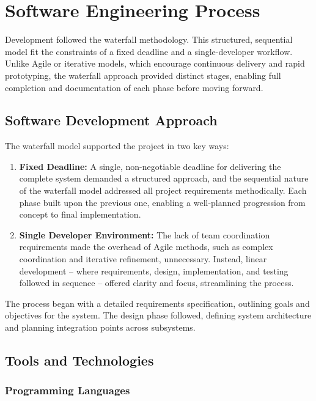 \chapter{Software Engineering Process}
\label{chapter:sep}


Development followed the waterfall methodology\cite{royce1987managing}. This structured, sequential model fit the constraints of a fixed deadline and a single-developer workflow. Unlike Agile\cite{atlassian2025agile} or iterative models, which encourage continuous delivery and rapid prototyping, the waterfall approach provided distinct stages, enabling full completion and documentation of each phase before moving forward.

\section{Software Development Approach}

The waterfall model supported the project in two key ways:
\begin{enumerate}
	\item \textbf{Fixed Deadline:} A single, non-negotiable deadline for delivering the complete system demanded a structured approach, and the sequential nature of the waterfall model addressed all project requirements methodically. Each phase built upon the previous one, enabling a well-planned progression from concept to final implementation.

	\item \textbf{Single Developer Environment:} The lack of team coordination requirements made the overhead of Agile methods, such as complex coordination and iterative refinement, unnecessary. Instead, linear development -- where requirements, design, implementation, and testing followed in sequence -- offered clarity and focus, streamlining the process.

\end{enumerate}

The process began with a detailed requirements specification, outlining goals and objectives for the system. The design phase followed, defining system architecture and planning integration points across subsystems.

\section{Tools and Technologies}

\subsection{Programming Languages}

